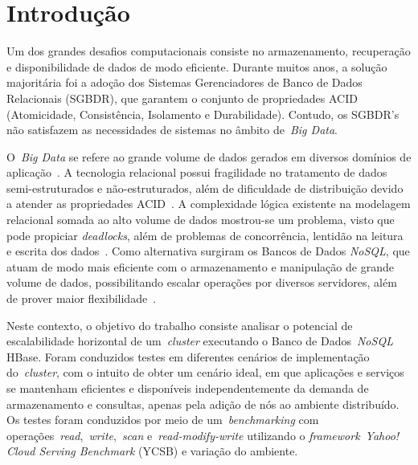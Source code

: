 \documentclass[12pt]{article}
\begin{document}
\section{Introdução}
\label{sec:introducao}
 
Um dos grandes desafios computacionais consiste no armazenamento, recuperação e disponibilidade de dados de modo eficiente. Durante muitos anos, a solução majoritária foi a adoção dos Sistemas Gerenciadores de Banco de Dados Relacionais (SGBDR), que garantem o conjunto de propriedades ACID (Atomicidade, Consistência, Isolamento e Durabilidade). Contudo, os SGBDR’s não satisfazem as necessidades de sistemas no âmbito de~\emph{Big Data}.%
 
O~\textit{Big Data} se refere ao grande volume de dados gerados em diversos domínios de aplicação~\cite{han2011survey}. A tecnologia relacional possui fragilidade no tratamento de dados semi-estruturados e não-estruturados, além de dificuldade de distribuição devido a atender as propriedades ACID~\cite{aparicio:2016}. 
A complexidade lógica existente na modelagem relacional somada ao alto volume de dados mostrou-se um problema, visto que pode propiciar \textit{deadlocks}, além de problemas de concorrência, lentidão na leitura e escrita dos dados~\cite{han2011survey}. 
Como alternativa surgiram os Bancos de Dados \textit{NoSQL}, que atuam de modo mais eficiente com o armazenamento e manipulação de grande volume de dados, possibilitando escalar operações por diversos servidores, além de prover maior flexibilidade~\cite{ramesh:2016}.

Neste contexto, o objetivo do trabalho consiste analisar o potencial de escalabilidade horizontal de um~\emph{cluster} executando o Banco de Dados~\emph{NoSQL} HBase. Foram conduzidos testes em diferentes cenários de implementação do~\emph{cluster}, com o intuito de obter um cenário ideal, em que aplicações e serviços se mantenham eficientes e disponíveis independentemente da demanda de armazenamento e consultas, apenas pela adição de nós ao ambiente distribuído. Os testes foram conduzidos por meio de um~\emph{benchmarking} com operações~\emph{read},~\emph{write},~\emph{scan} e~\emph{read-modify-write} utilizando o \textit{framework}~\emph{Yahoo! Cloud Serving Benchmark} (YCSB) e variação do ambiente.

\end{document}
